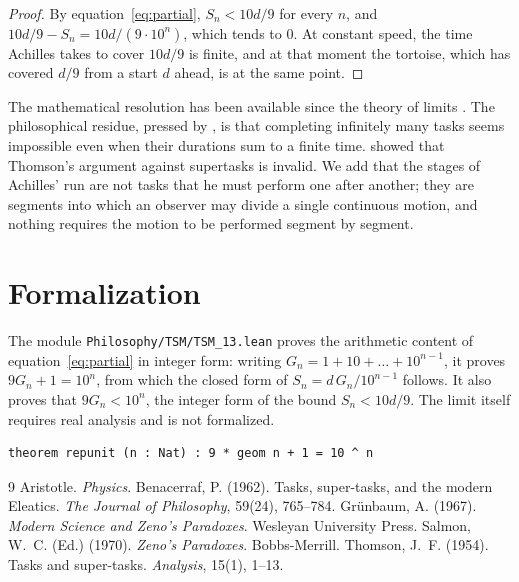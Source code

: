 \documentclass{situationist-preprint}
\begin{document}
\begin{proof}
By equation~\eqref{eq:partial}, $S_n < 10d/9$ for every $n$, and $10d/9 - S_n = 10d/(9 \cdot 10^n)$, which tends to $0$. At constant speed, the time Achilles takes to cover $10d/9$ is finite, and at that moment the tortoise, which has covered $d/9$ from a start $d$ ahead, is at the same point.
\end{proof}

The mathematical resolution has been available since the theory of limits \citep{Grunbaum1967,Salmon1970}. The philosophical residue, pressed by \citet{Thomson1954}, is that completing infinitely many tasks seems impossible even when their durations sum to a finite time. \citet{Benacerraf1962} showed that Thomson's argument against supertasks is invalid. We add that the stages of Achilles' run are not tasks that he must perform one after another; they are segments into which an observer may divide a single continuous motion, and nothing requires the motion to be performed segment by segment.

\section{Formalization}

The module \nolinkurl{Philosophy/TSM/TSM_13.lean} proves the arithmetic content of equation~\eqref{eq:partial} in integer form: writing $G_n = 1 + 10 + \dots + 10^{n-1}$, it proves $9 G_n + 1 = 10^n$, from which the closed form of $S_n = d\,G_n/10^{n-1}$ follows. It also proves that $9 G_n < 10^n$, the integer form of the bound $S_n < 10d/9$. The limit itself requires real analysis and is not formalized.

\begin{lstlisting}
theorem repunit (n : Nat) : 9 * geom n + 1 = 10 ^ n
\end{lstlisting}

\begin{thebibliography}{9}\small
{} Aristotle. \emph{Physics}.
 Benacerraf, P. (1962). Tasks, super-tasks, and the modern Eleatics. \emph{The Journal of Philosophy}, 59(24), 765--784.
 Grünbaum, A. (1967). \emph{Modern Science and Zeno's Paradoxes}. Wesleyan University Press.
 Salmon, W.~C. (Ed.) (1970). \emph{Zeno's Paradoxes}. Bobbs-Merrill.
 Thomson, J.~F. (1954). Tasks and super-tasks. \emph{Analysis}, 15(1), 1--13.
\end{thebibliography}
\end{document}
